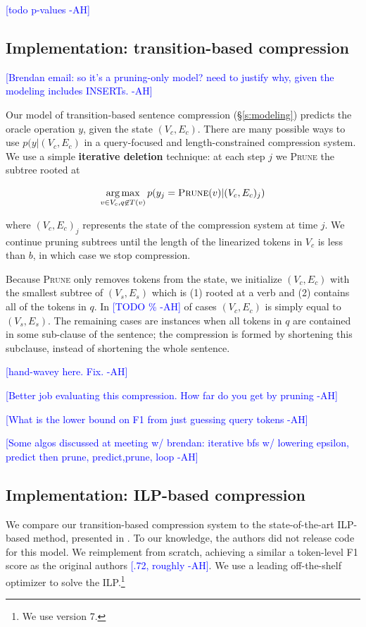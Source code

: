 \documentclass[11pt,a4paper]{article}
\newcommand{\ahcomment}[1]{\textcolor{blue}{[#1 -AH]}}
\DeclareMathOperator*{\argmaxA}{arg\,max} %
\begin{document}
\ahcomment{todo p-values}


\subsection{Implementation: transition-based compression}\label{s:transition}

\ahcomment{Brendan email: so it's a pruning-only model?  need to justify why, given the modeling includes INSERTs.} 

Our model of transition-based sentence compression (\S\ref{s:modeling}) predicts the oracle operation $y$, given the state $(V_c, E_c)$. There are many possible ways to use $p(y|(V_c, E_c)$ in a query-focused and length-constrained compression system. We use a simple \textbf{iterative deletion} technique: at each step $j$ we \textsc{Prune} the subtree rooted at 

$$\argmaxA_{v \in V_c,q\not\in T(v)}   p(y_j = \textsc{Prune}(v) | (V_c, E_c)_j)$$

\noindent where $(V_c, E_c)_j$ represents the state of the compression system at time $j$. We continue pruning subtrees until the length of the linearized tokens in $V_c$ is less than $b$, in which case we stop compression. 

Because \textsc{Prune} only removes tokens from the state, we initialize $(V_c, E_c)$ with the smallest subtree of $(V_s, E_s)$ which is (1) rooted at a verb and (2) contains all of the tokens in $q$. In \ahcomment{TODO \%} of cases $(V_c, E_c)$ is simply equal to $(V_s, E_s)$. The remaining cases are instances when all tokens in $q$ are contained in some sub-clause of the sentence; the compression is formed by shortening this subclause, instead of shortening the whole sentence.

\ahcomment{hand-wavey here. Fix.}

\ahcomment{Better job evaluating this compression. How far do you get  by pruning}

\ahcomment{What is the lower bound on F1 from just guessing query tokens} 

\ahcomment{Some algos discussed at meeting w/ brendan: iterative bfs w/ lowering epsilon, predict then prune, predict,prune, loop}

\subsection{Implementation: ILP-based compression}\label{s:ilp}

We compare our transition-based compression system to the state-of-the-art ILP-based method, presented in \citet{filippova2013overcoming}. To our knowledge, the authors did not release code for this model. We reimplement from scratch, achieving a similar a token-level F1 score as the original authors \ahcomment{.72, roughly}. We use a leading off-the-shelf optimizer \cite{gurobi} to solve the ILP.\footnote{We use version 7.} 
\end{document}
